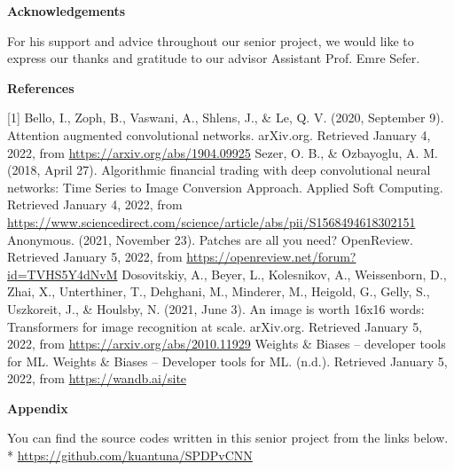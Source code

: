 \documentclass[]{article}
\begin{document}
\begin{center}
    \textbf{\Large Acknowledgements}
\end{center}
For his support and advice throughout our senior project, we would like to express our thanks and gratitude to our advisor Assistant Prof. Emre Sefer. \vspace{0.1cm}

\begin{center}
    \textbf{\Large References}
\end{center}
[1] Bello, I., Zoph, B., Vaswani, A., Shlens, J., \& Le, Q. V. (2020, September 9). Attention augmented convolutional networks. arXiv.org. Retrieved January 4, 2022, from \href{https://arxiv.org/abs/1904.09925}{https://arxiv.org/abs/1904.09925}\vspace{0.1cm} \newline
[2] Sezer, O. B., \& Ozbayoglu, A. M. (2018, April 27). Algorithmic financial trading with deep convolutional neural networks: Time Series to Image Conversion Approach. Applied Soft Computing. Retrieved January 4, 2022, from \href{https://www.sciencedirect.com/science/article/abs/pii/S1568494618302151}{https://www.sciencedirect.com/science/article/abs/pii/S1568494618302151}\vspace{0.1cm} \newline
[3] Anonymous. (2021, November 23). Patches are all you need? OpenReview. Retrieved January 5, 2022, from \href{https://openreview.net/forum?id=TVHS5Y4dNvM}{https://openreview.net/forum?id=TVHS5Y4dNvM}\vspace{0.1cm} \newline
[4] Dosovitskiy, A., Beyer, L., Kolesnikov, A., Weissenborn, D., Zhai, X., Unterthiner, T., Dehghani, M., Minderer, M., Heigold, G., Gelly, S., Uszkoreit, J., \& Houlsby, N. (2021, June 3). An image is worth 16x16 words: Transformers for image recognition at scale. arXiv.org. Retrieved January 5, 2022, from \href{https://arxiv.org/abs/2010.11929}{https://arxiv.org/abs/2010.11929} \vspace{0.1cm} \newline
[5] Weights \& Biases – developer tools for ML. Weights \& Biases – Developer tools for ML. (n.d.). Retrieved January 5, 2022, from \href{https://wandb.ai/site}{https://wandb.ai/site} \vspace{0.1cm}

\begin{center}
    \textbf{\Large Appendix}
\end{center}
You can find the source codes written in this senior project from the links below.\\* \href{https://github.com/kuantuna/SPDPvCNN}{https://github.com/kuantuna/SPDPvCNN}
\end{document}
